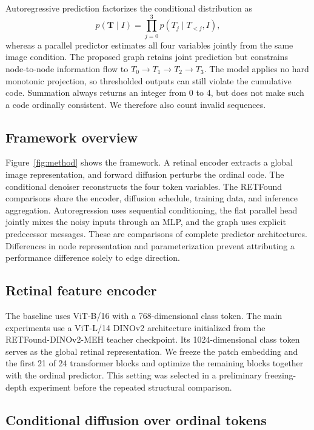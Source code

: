 \documentclass[a4paper,fleqn]{cas-sc}
\begin{document}
Autoregressive prediction factorizes the conditional distribution as
\begin{equation}
 p(\mathbf{T}\mid I)=\prod_{j=0}^{3}p(T_j\mid T_{<j},I),
 \label{eq:factorization}
\end{equation}
whereas a parallel predictor estimates all four variables jointly from the same image condition. The proposed graph retains joint prediction but constrains node-to-node information flow to $T_0\rightarrow T_1\rightarrow T_2\rightarrow T_3$. The model applies no hard monotonic projection, so thresholded outputs can still violate the cumulative code. Summation always returns an integer from 0 to 4, but does not make such a code ordinally consistent. We therefore also count invalid sequences.

\subsection{Framework overview}

Figure~\ref{fig:method} shows the framework. A retinal encoder extracts a global image representation, and forward diffusion perturbs the ordinal code. The conditional denoiser reconstructs the four token variables. The RETFound comparisons share the encoder, diffusion schedule, training data, and inference aggregation. Autoregression uses sequential conditioning, the flat parallel head jointly mixes the noisy inputs through an MLP, and the graph uses explicit predecessor messages. These are comparisons of complete predictor architectures. Differences in node representation and parameterization prevent attributing a performance difference solely to edge direction.

\subsection{Retinal feature encoder}

The baseline uses ViT-B/16 with a 768-dimensional class token. The main experiments use a ViT-L/14 DINOv2 architecture initialized from the RETFound-DINOv2-MEH teacher checkpoint. Its 1024-dimensional class token serves as the global retinal representation. We freeze the patch embedding and the first 21 of 24 transformer blocks and optimize the remaining blocks together with the ordinal predictor. This setting was selected in a preliminary freezing-depth experiment before the repeated structural comparison.

\subsection{Conditional diffusion over ordinal tokens}
\end{document}
